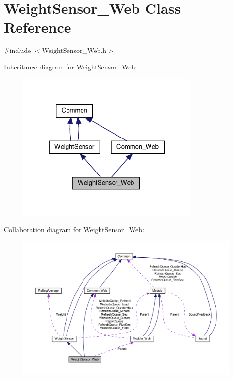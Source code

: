 \hypertarget{class_weight_sensor___web}{}\section{Weight\+Sensor\+\_\+\+Web Class Reference}
\label{class_weight_sensor___web}


{\ttfamily \#include $<$Weight\+Sensor\+\_\+\+Web.\+h$>$}



Inheritance diagram for Weight\+Sensor\+\_\+\+Web\+:
\nopagebreak
\begin{figure}[H]
\begin{center}
\leavevmode
\includegraphics[width=258pt]{class_weight_sensor___web__inherit__graph}
\end{center}
\end{figure}


Collaboration diagram for Weight\+Sensor\+\_\+\+Web\+:
\nopagebreak
\begin{figure}[H]
\begin{center}
\leavevmode
\includegraphics[width=350pt]{class_weight_sensor___web__coll__graph}
\end{center}
\end{figure}
